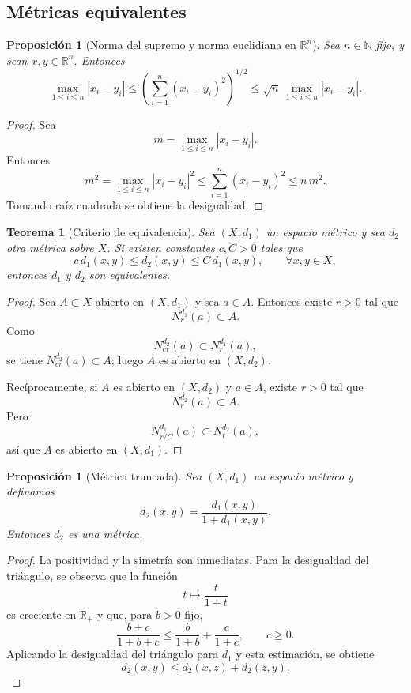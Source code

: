 \documentclass[12pt]{article}
\theoremstyle{definition}
\theoremstyle{plain}
\newtheorem{theorem}[definition]{Teorema}
\newtheorem{proposition}[definition]{Proposición}
\theoremstyle{remark}
\begin{document}
\subsection*{Métricas equivalentes}

\begin{proposition}[Norma del supremo y norma euclidiana en $\mathbb R^n$]
Sea $n\in\mathbb N$ fijo, y sean $x,y\in\mathbb R^n$.
Entonces
\[
\max_{1\le i\le n}|x_i-y_i|
\le
\left(\sum_{i=1}^n(x_i-y_i)^2\right)^{1/2}
\le
\sqrt n\,\max_{1\le i\le n}|x_i-y_i|.
\]
\end{proposition}

\begin{proof}
Sea
\[
m=\max_{1\le i\le n}|x_i-y_i|.
\]
Entonces
\[
m^2=\max_{1\le i\le n}|x_i-y_i|^2
\le \sum_{i=1}^n(x_i-y_i)^2
\le n\,m^2.
\]
Tomando raíz cuadrada se obtiene la desigualdad.
\end{proof}

\begin{theorem}[Criterio de equivalencia]
Sea $(X,d_1)$ un espacio métrico y sea $d_2$ otra métrica sobre $X$.
Si existen constantes $c,C>0$ tales que
\[
c\,d_1(x,y)\le d_2(x,y)\le C\,d_1(x,y),\qquad \forall x,y\in X,
\]
entonces $d_1$ y $d_2$ son equivalentes.
\end{theorem}

\begin{proof}
Sea $A\subset X$ abierto en $(X,d_1)$ y sea $a\in A$.
Entonces existe $r>0$ tal que
\[
N_r^{d_1}(a)\subset A.
\]
Como
\[
N_{cr}^{d_2}(a)\subset N_r^{d_1}(a),
\]
se tiene $N_{cr}^{d_2}(a)\subset A$; luego $A$ es abierto en $(X,d_2)$.

Recíprocamente, si $A$ es abierto en $(X,d_2)$ y $a\in A$, existe $r>0$ tal que
\[
N_r^{d_2}(a)\subset A.
\]
Pero
\[
N_{r/C}^{d_1}(a)\subset N_r^{d_2}(a),
\]
así que $A$ es abierto en $(X,d_1)$.
\end{proof}

\begin{proposition}[Métrica truncada]
Sea $(X,d_1)$ un espacio métrico y definamos
\[
d_2(x,y)=\frac{d_1(x,y)}{1+d_1(x,y)}.
\]
Entonces $d_2$ es una métrica.
\end{proposition}

\begin{proof}
La positividad y la simetría son inmediatas.
Para la desigualdad del triángulo, se observa que la función
\[
t\longmapsto \frac{t}{1+t}
\]
es creciente en $\mathbb R_+$ y que, para $b>0$ fijo,
\[
\frac{b+c}{1+b+c}\le \frac b{1+b}+\frac c{1+c},\qquad c\ge 0.
\]
Aplicando la desigualdad del triángulo para $d_1$ y esta estimación, se obtiene
\[
d_2(x,y)\le d_2(x,z)+d_2(z,y).
\]
\end{proof}
\end{document}
